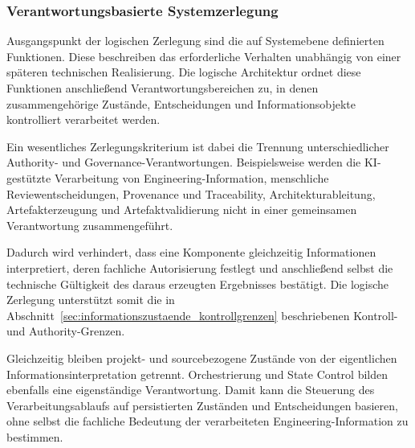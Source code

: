 \subsubsection{Verantwortungsbasierte Systemzerlegung}
\label{sec:verantwortungsbasierte_zerlegung}

%
%
%
%
%
%

Ausgangspunkt der logischen Zerlegung sind die auf Systemebene definierten
Funktionen. Diese beschreiben das erforderliche Verhalten unabhängig von einer
späteren technischen Realisierung. Die logische Architektur ordnet diese
Funktionen anschließend Verantwortungsbereichen zu, in denen zusammengehörige
Zustände, Entscheidungen und Informationsobjekte kontrolliert verarbeitet
werden.

Ein wesentliches Zerlegungskriterium ist dabei die Trennung unterschiedlicher
Authority- und Governance-Verantwortungen. Beispielsweise werden die
KI-gestützte Verarbeitung von Engineering-Information, menschliche
Reviewentscheidungen, Provenance und Traceability, Architekturableitung,
Artefakterzeugung und Artefaktvalidierung nicht in einer gemeinsamen
Verantwortung zusammengeführt.

Dadurch wird verhindert, dass eine Komponente gleichzeitig Informationen
interpretiert, deren fachliche Autorisierung festlegt und anschließend selbst
die technische Gültigkeit des daraus erzeugten Ergebnisses bestätigt. Die
logische Zerlegung unterstützt somit die in
Abschnitt~\ref{sec:informationszustaende_kontrollgrenzen} beschriebenen
Kontroll- und Authority-Grenzen.

Gleichzeitig bleiben projekt- und sourcebezogene Zustände von der eigentlichen
Informationsinterpretation getrennt. Orchestrierung und State Control bilden
ebenfalls eine eigenständige Verantwortung. Damit kann die Steuerung des
Verarbeitungsablaufs auf persistierten Zuständen und Entscheidungen basieren,
ohne selbst die fachliche Bedeutung der verarbeiteten Engineering-Information
zu bestimmen.

